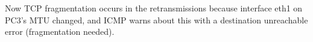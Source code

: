 Now TCP fragmentation occurs in the retransmissions because interface eth1 on PC3's MTU changed, and ICMP warns about this with a destination unreachable error (fragmentation needed).